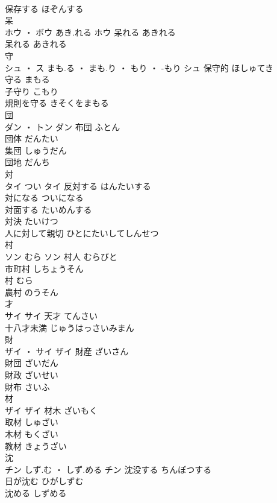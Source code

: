 \documentclass[8pt]{extreport}
\begin{document}
\begin{CJK}{UTF8}{min}
\\	保存する	ほぞんする	
\\	呆	
\\	ホウ ・ ボウ	あき.れる	ホウ	呆れる	あきれる	
\\	呆れる	あきれる	
\\	守	
\\	シュ ・ ス	まも.る ・ まも.り ・ もり ・ -もり	シュ	保守的	ほしゅてき	
\\	守る	まもる	
\\	子守り	こもり	
\\	規則を守る	きそくをまもる	
\\	団	
\\	ダン ・ トン		ダン	布団	ふとん	
\\	団体	だんたい	
\\	集団	しゅうだん	
\\	団地	だんち	
\\	対	
\\	タイ	つい	タイ	反対する	はんたいする	
\\	対になる	ついになる	
\\	対面する	たいめんする	
\\	対決	たいけつ	
\\	人に対して親切	ひとにたいしてしんせつ	
\\	村	
\\	ソン	むら	ソン	村人	むらびと	
\\	市町村	しちょうそん	
\\	村	むら	
\\	農村	のうそん	
\\	才	
\\	サイ		サイ	天才	てんさい	
\\	十八才未満	じゅうはっさいみまん	
\\	財	
\\	ザイ ・ サイ		ザイ	財産	ざいさん	
\\	財団	ざいだん	
\\	財政	ざいせい	
\\	財布	さいふ	
\\	材	
\\	ザイ		ザイ	材木	ざいもく	
\\	取材	しゅざい	
\\	木材	もくざい	
\\	教材	きょうざい	
\\	沈	
\\	チン	しず.む ・ しず.める	チン	沈没する	ちんぼつする	
\\	日が沈む	ひがしずむ	
\\	沈める	しずめる	

\end{CJK}
\end{document}
